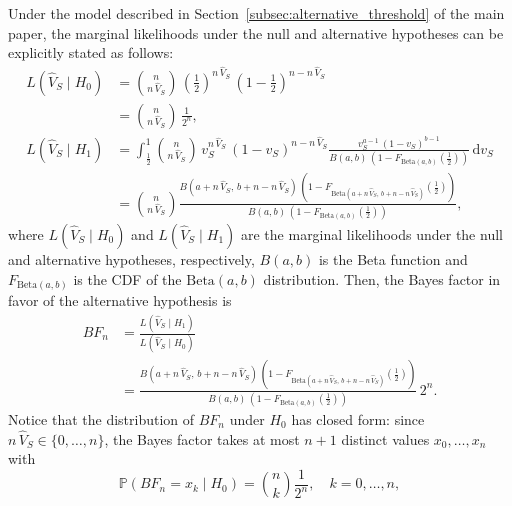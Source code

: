 \documentclass[referee,usenatbib]{biom}
\begin{document}
Under the model described in Section~\ref{subsec:alternative_threshold} of the main paper, the marginal likelihoods under the null and alternative hypotheses can be explicitly stated as follows:
\begin{align*}
    L\!\left(\widehat{V}_{S} \mid H_{0}\right) & = \binom{n}{n \, \widehat{V}_{S}} \, \left( \frac{1}{2} \right)^{n \, \widehat{V}_{S}} \, \left( 1 - \frac{1}{2} \right)^{n - n \, \widehat{V}_{S}} \\
    & = \binom{n}{n \, \widehat{V}_{S}} \, \frac{1}{2^{n}}, \\
    L\!\left(\widehat{V}_{S} \mid H_{1}\right) & = \int_{\frac{1}{2}}^{1} \binom{n}{n \, \widehat{V}_{S}} \, v_{S}^{n \, \widehat{V}_{S}} \, (1 - v_{S})^{n - n \, \widehat{V}_{S}} \frac{v_{S}^{a-1} \, (1 - v_{S})^{b-1}}{B(a,b) \, (1 - F_{\mathrm{Beta}(a,b)}\!\left(\tfrac{1}{2}\right))} \, \text{d}v_{S} \\
    & = \binom{n}{n \, \widehat{V}_{S}} \frac{B\!\left(a + n \, \widehat{V}_{S}, \, b + n - n \, \widehat{V}_{S}\right) \, \left(1 - F_{\mathrm{Beta}\left(a + n \, \widehat{V}_{S},\, b + n - n \, \widehat{V}_{S}\right)}\!\!\left(\tfrac{1}{2}\right)\right)}{B(a,b) \, \left(1 - F_{\mathrm{Beta}(a,b)}\!\left(\tfrac{1}{2}\right)\right)},
\end{align*}
where \( L\!\left(\widehat{V}_{S} \mid H_{0}\right) \) and \( L\!\left(\widehat{V}_{S} \mid H_{1}\right) \) are the marginal likelihoods under the null and alternative hypotheses, respectively, \(B(a, b)\) is the Beta function and \(F_{\mathrm{Beta}(a,b)}\) is the CDF of the \(\mathrm{Beta}(a,b)\) distribution. Then, the Bayes factor in favor of the alternative hypothesis is
\begin{align*}
    BF_{n} & = \frac{L\!\left(\widehat{V}_{S} \mid H_{1}\right)}{L\!\left(\widehat{V}_{S} \mid H_{0}\right)} \\
    & = \frac{B\!\left(a + n \, \widehat{V}_{S},\, b + n - n \, \widehat{V}_{S}\right) \, \left(1 - F_{\mathrm{Beta}\left(a + n \, \widehat{V}_{S},\, b + n - n \, \widehat{V}_{S}\right)}\!\!\left(\tfrac{1}{2}\right)\right)}{B(a,b) \, \left(1 - F_{\mathrm{Beta}(a,b)}\!\left(\tfrac{1}{2}\right)\right)} \, 2^{n}.
\end{align*}
Notice that the distribution of \(BF_{n}\) under \(H_{0}\) has closed form: since \(n \, \widehat{V}_{S} \in \{0, \ldots, n\}\), the Bayes factor takes at most \(n + 1\) distinct values \(x_{0}, \ldots, x_{n}\) with
\begin{equation*}
    \mathbb{P}(BF_{n} = x_{k} \mid H_0) = \binom{n}{k} \frac{1}{2^{n}}, \quad k = 0, \ldots, n,
\end{equation*}
\end{document}
